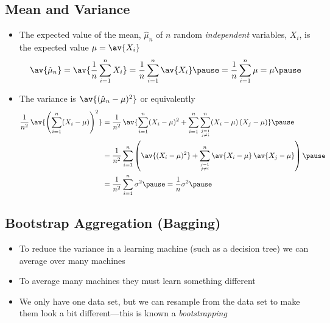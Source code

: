 
\begin{slide}
\section[-2]{Mean and Variance}

\begin{PauseHighLight}\small
  \begin{itemize}
  \item The expected value of the mean, $\hat{\mu}_n$ of $n$ random
    \emph{independent} variables, $X_i$, is the expected value $\mu=\av{X_i}$
    \begin{align*}
      \av{\hat{\mu}_n}
      =\av{\frac{1}{n} \sum_{i=1}^n X_i } = \frac{1}{n} \sum_{i=1}^n
      \av{X_i} \pause = \frac{1}{n} \sum_{i=1}^n \mu = \mu\pause
    \end{align*}
  \item The variance is $\av{ (\hat{\mu}_n-\mu)^2 }$ or equivalently 
    \begin{align*}
      \frac{1}{n^2} \, \av{ \left(\sum_{i=1}^n (X_i -\mu)\right)^2}
      &=\frac{1}{n^2} \, \av{ \sum_{i=1}^n (X_i -\mu)^2
        + \sum_{i=1}^n\sum_{j=1\atop j\neq i}^n (X_i-\mu)\,(X_j-\mu)}\pause\\
      &= \frac{1}{n^2}\sum_{i=1}^n \left( \av{(X_i -\mu)^2}
        + \sum_{j=1\atop j\neq i}^n
      \av{X_i-\mu}\,\av{X_j-\mu} \right)\pause\\
      &=\frac{1}{n^2} \sum_{i=1}^n \sigma^2\pause = \frac{1}{n} \sigma^2
        \pause
    \end{align*}
  \end{itemize}
\end{PauseHighLight}


\end{slide}


\begin{slide}
\section[-2]{Bootstrap Aggregation (Bagging)}

\pb
\begin{itemize}
\item To reduce the variance in a learning machine (such as a decision
  tree) we can average over many machines\pauseh
\item To average many machines they must learn something different\pauseh
\item We only have one data set, but we can resample from the data set
  to make them look a bit different\pauseh---this is known a
  \emph{bootstrapping}\pauseh
\end{itemize}
\begin{center}
  \pause
\end{center}

\end{slide}

